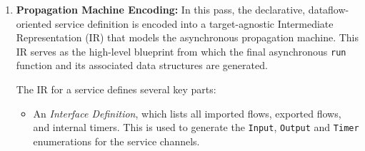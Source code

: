 \begin{enumerate}
          \begin{multicols}{2}
              The dependency graph for the service \texttt{hazard\_light\_controller}:
              \begin{center}
              \end{center}
              \newcolumn
              The nodes in red represent the primary inputs to the dataflow: the imported event
              \texttt{hazard\_button\_pressed} (4) and the explicit timer \texttt{t} (8). The graph
              shows how a change from these sources propagates through the  (6),
               (9), and \texttt{toggle} (5) operations.
          \end{multicols}

    \item \textbf{Propagation Machine Encoding:} In this pass, the declarative, dataflow-oriented
          service definition is encoded into a target-agnostic Intermediate Representation (IR) that
          models the asynchronous propagation machine. This IR serves as the high-level blueprint
          from which the final asynchronous \Rust \texttt{run} function and its associated data
          structures are generated.

          The IR for a service defines several key parts:
          \begin{itemize}
              \item An \emph{Interface Definition}, which lists all imported flows, exported flows,
                    and internal timers. This is used to generate the \texttt{Input},
                    \texttt{Output} and \texttt{Timer} enumerations for the service channels.


\end{itemize}
\end{enumerate}
